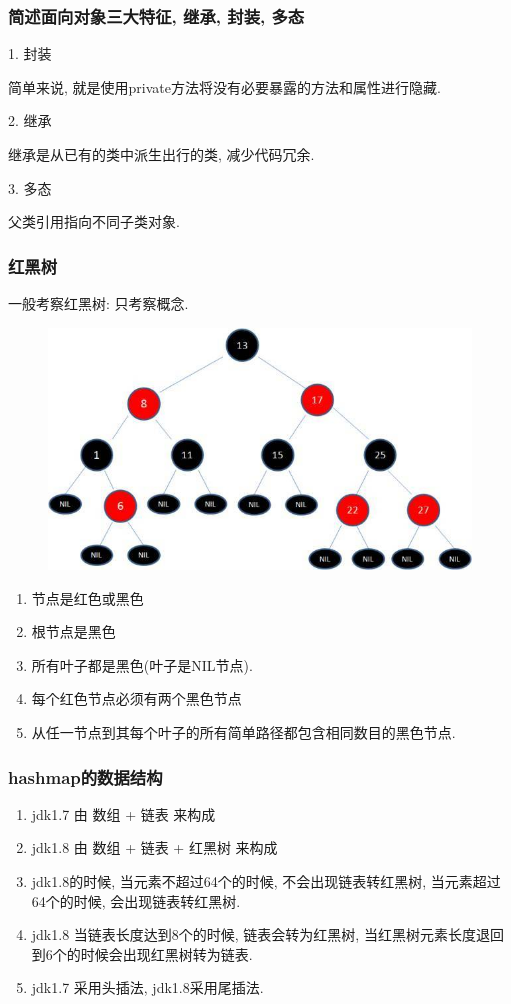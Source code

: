 \documentclass[UTF8]{ctexart}
\begin{document}
\subsubsection{简述面向对象三大特征, 继承, 封装, 多态}
1. 封装
\par
简单来说, 就是使用private方法将没有必要暴露的方法和属性进行隐藏.
\par
2. 继承
\par
继承是从已有的类中派生出行的类, 减少代码冗余. 
\par
3. 多态
\par
父类引用指向不同子类对象.
\subsubsection{红黑树}
一般考察红黑树: 只考察概念.
\begin{figure}
	\centering
	\includegraphics[width=0.7\linewidth]{figures/red_black.jpg}
	\caption{}
	\label{fig:jvm_copy}
\end{figure}
\begin{enumerate}
	\item 节点是红色或黑色
	\item 根节点是黑色
	\item 所有叶子都是黑色(叶子是NIL节点).
	\item 每个红色节点必须有两个黑色节点
	\item 从任一节点到其每个叶子的所有简单路径都包含相同数目的黑色节点.
	
\end{enumerate}

	\subsubsection{hashmap的数据结构}
	\begin{enumerate}
		\item jdk1.7 由 数组 + 链表  来构成
		\item jdk1.8 由 数组 + 链表 + 红黑树 来构成
		\item jdk1.8的时候, 当元素不超过64个的时候, 不会出现链表转红黑树, 当元素超过64个的时候, 会出现链表转红黑树.
		\item jdk1.8 当链表长度达到8个的时候, 链表会转为红黑树, 当红黑树元素长度退回到6个的时候会出现红黑树转为链表.
		\item jdk1.7 采用头插法, jdk1.8采用尾插法.
	\end{enumerate}
\end{document}
